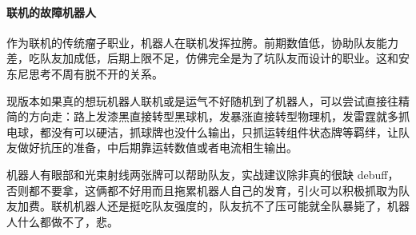\documentclass[12pt, a4paper]{article}
\begin{document}
\paragraph{联机的故障机器人}
作为联机的传统瘤子职业，机器人在联机发挥拉胯。前期数值低，协助队友能力差，吃队友加成低，后期上限不足，仿佛完全是为了坑队友而设计的职业。这和安东尼思考不周有脱不开的关系。

现版本如果真的想玩机器人联机或是运气不好随机到了机器人，可以尝试直接往精简的方向走：路上发漆黑直接转型黑球机，发暴涨直接转型物理机，发雷霆就多抓电球，都没有可以硬洁，抓球牌也没什么输出，只抓运转组件状态牌等羁绊，让队友做好抗压的准备，中后期靠运转数值或者电流相生输出。

机器人有眼部和光束射线两张牌可以帮助队友，实战建议除非真的很缺 debuff，否则都不要拿，这俩都不好用而且拖累机器人自己的发育，引火可以积极抓取为队友加费。联机机器人还是挺吃队友强度的，队友抗不了压可能就全队暴毙了，机器人什么都做不了，悲。
\end{document}
